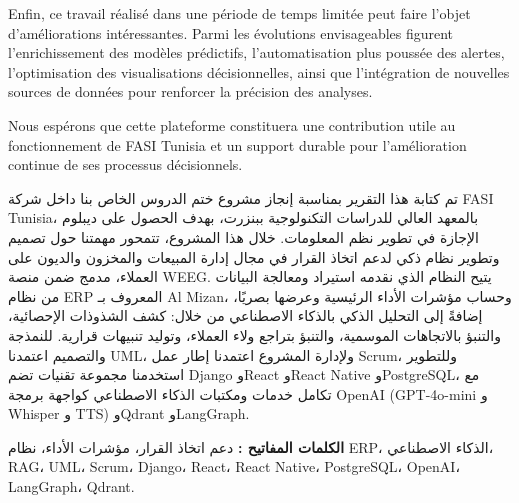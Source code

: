 \documentclass[a4paper,12pt]{report}
\newenvironment{الملخّص}{%
    \par\smallskip
    \noindent{\normalsize\bfseries\textarabic{الملخّص}}\par\smallskip
    \small
    \begin{otherlanguage*}{arabic}
}{%
    \end{otherlanguage*}
    \par\smallskip
    \normalsize
}
\begin{document}
Enfin, ce travail réalisé dans une période de temps limitée peut faire l'objet d'améliorations intéressantes. Parmi les évolutions envisageables figurent l'enrichissement des modèles prédictifs, l'automatisation plus poussée des alertes, l'optimisation des visualisations décisionnelles, ainsi que l'intégration de nouvelles sources de données pour renforcer la précision des analyses.

Nous espérons que cette plateforme constituera une contribution utile au fonctionnement de FASI Tunisia et un support durable pour l'amélioration continue de ses processus décisionnels.


\cleardoublepage
{}
{}

\nocite{A7,A8,A9,A10,A11}
\printbibliography[title={Bibliographie et Nétographie}]

\cleardoublepage
\thispagestyle{empty}

\begin{الملخّص}
تم كتابة هذا التقرير بمناسبة إنجاز مشروع ختم الدروس الخاص بنا داخل شركة
FASI Tunisia، بالمعهد العالي للدراسات التكنولوجية ببنزرت، بهدف الحصول على
ديبلوم الإجازة في تطوير نظم المعلومات. خلال هذا المشروع، تتمحور مهمتنا حول
تصميم وتطوير نظام ذكي لدعم اتخاذ القرار في مجال إدارة المبيعات والمخزون
والديون على العملاء، مدمج ضمن منصة WEEG. يتيح النظام الذي نقدمه استيراد
ومعالجة البيانات من نظام ERP المعروف بـ Al Mizan، وحساب مؤشرات الأداء
الرئيسية وعرضها بصريًا، إضافةً إلى التحليل الذكي بالذكاء الاصطناعي من خلال:
كشف الشذوذات الإحصائية، والتنبؤ بالاتجاهات الموسمية، والتنبؤ بتراجع ولاء
العملاء، وتوليد تنبيهات قرارية. للنمذجة والتصميم اعتمدنا UML، ولإدارة المشروع
اعتمدنا إطار عمل Scrum، وللتطوير استخدمنا مجموعة تقنيات تضم Django وReact
وReact Native وPostgreSQL، مع تكامل خدمات ومكتبات الذكاء الاصطناعي كواجهة
برمجة OpenAI (GPT-4o-mini و Whisper و TTS) وQdrant وLangGraph.

\textbf{الكلمات المفاتيح :}
دعم اتخاذ القرار، مؤشرات الأداء، نظام ERP، الذكاء الاصطناعي، RAG،
UML، Scrum، Django، React، React Native، PostgreSQL، OpenAI، LangGraph، Qdrant.
\end{الملخّص} 

\end{document}
